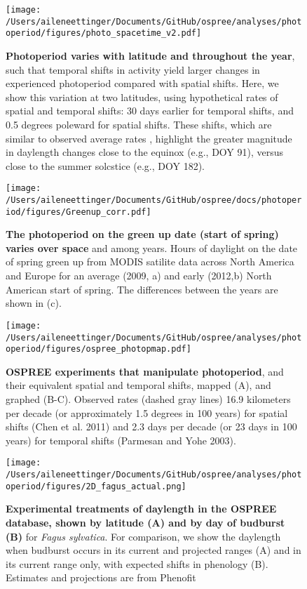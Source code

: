 \documentclass{article}
\begin{document}
\begin{figure}[p]
\centering
\texttt{[image: /Users/aileneettinger/Documents/GitHub/ospree/analyses/photoperiod/figures/photo\_spacetime\_v2.pdf]} %
\caption{\textbf{Photoperiod varies with latitude and throughout the year}, such that temporal shifts in activity yield larger changes in experienced photoperiod compared with spatial shifts. Here, we show this variation at two latitudes, using hypothetical rates of spatial and temporal shifts: 30 days earlier for temporal shifts, and 0.5 degrees poleward for spatial shifts. These shifts, which are similar to observed average rates \citep[][e.g.,]{parmesan2006,chen2011}, highlight the greater magnitude in daylength changes close to the equinox (e.g., DOY 91), versus close to the summer solcstice (e.g., DOY 182).}
 \label{fig:spacetime}%
 \end{figure}
 
\begin{figure}[p]
\centering
\texttt{[image: /Users/aileneettinger/Documents/GitHub/ospree/docs/photoperiod/figures/Greenup\_corr.pdf]} %
\caption{\textbf{The photoperiod on the green up date (start of spring) varies over space} and among years. Hours of daylight on the date of spring green up from MODIS satilite data across North America and Europe for an average (2009, a) and  early (2012,b) North American start of spring. The differences between the years are shown in (c). }
 \label{fig:greenup}%
 \end{figure}
\begin{figure}[p]
\centering
\texttt{[image: /Users/aileneettinger/Documents/GitHub/ospree/analyses/photoperiod/figures/ospree\_photopmap.pdf]} 
\caption{\textbf{OSPREE experiments that manipulate photoperiod}, and their equivalent spatial and temporal shifts, mapped (A), and graphed (B-C). Observed rates (dashed gray lines) 16.9 kilometers per decade (or approximately 1.5 degrees in 100 years) for spatial shifts (Chen et al. 2011) and 2.3 days per decade (or 23 days in 100 years) for temporal shifts (Parmesan and Yohe 2003).}
 \label{fig:photomap}
 \end{figure}


 
\begin{figure}[p]
\texttt{[image: /Users/aileneettinger/Documents/GitHub/ospree/analyses/photoperiod/figures/2D\_fagus\_actual.png]} 
\caption{\textbf{Experimental treatments of daylength in the OSPREE database, shown by latitude (A) and by day of budburst (B)} for \textit{Fagus sylvatica}. For comparison, we show the daylength when budburst occurs in its current and projected ranges (A) and in its current range only, with expected shifts in phenology (B). Estimates and projections are from Phenofit \citep{duputie2015}}
 \label{fig:fagus}
 \end{figure}
 
\end{document}
